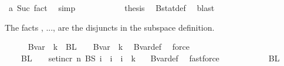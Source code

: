 \begin{isabellebody}
\ a\ Suc\ fact{}\ \isamarkupfalse%
\ simp\isanewline
\ \ \ \ \ \ \ \ \isamarkupfalse%
\ \isamarkupfalse%
\ {\isacharquery}{\kern0pt}thesis\ \isamarkupfalse%
\ Bstat{\isacharunderscore}{\kern0pt}def\ \isamarkupfalse%
\ blast\isanewline
\ \ \ \ \ \ \isamarkupfalse%
\isanewline
\ \ \ \ \isamarkupfalse%
%
\begin{isamarkuptext}%
The facts , ...,  are the disjuncts in the subspace definition.%
\end{isamarkuptext}\isamarkuptrue%
\ \ \ \ \isamarkupfalse%
\ {\isachardoublequoteopen}Bvar\ {\isacharbackquote}{\kern0pt}\ {\isacharbraceleft}{\kern0pt}{\isachardot}{\kern0pt}{\isachardot}{\kern0pt}{\isacharless}{\kern0pt}k{\isacharplus}{\kern0pt}{}{\isacharbraceright}{\kern0pt}\ {\isacharequal}{\kern0pt}\ BL\ {\isacharbackquote}{\kern0pt}\ {\isacharbraceleft}{\kern0pt}{\isachardot}{\kern0pt}{\isachardot}{\kern0pt}{\isacharless}{\kern0pt}{}{\isacharbraceright}{\kern0pt}\ {\isasymunion}\ Bvar\ {\isacharbackquote}{\kern0pt}\ {\isacharbraceleft}{\kern0pt}{}{\isachardot}{\kern0pt}{\isachardot}{\kern0pt}{\isacharless}{\kern0pt}k{\isacharplus}{\kern0pt}{}{\isacharbraceright}{\kern0pt}{\isachardoublequoteclose}\ \isamarkupfalse%
\ Bvar{\isacharunderscore}{\kern0pt}def\ \isamarkupfalse%
\ force\isanewline
\ \ \ \ \isamarkupfalse%
\ \isamarkupfalse%
\ {\isachardoublequoteopen}\ {\isachardot}{\kern0pt}{\isachardot}{\kern0pt}{\isachardot}{\kern0pt}\ {\isacharequal}{\kern0pt}\ BL\ {\isacharbackquote}{\kern0pt}\ {\isacharbraceleft}{\kern0pt}{\isachardot}{\kern0pt}{\isachardot}{\kern0pt}{\isacharless}{\kern0pt}{}{\isacharbraceright}{\kern0pt}\ {\isasymunion}\ {\isacharbraceleft}{\kern0pt}set{\isacharunderscore}{\kern0pt}incr\ n\ {\isacharparenleft}{\kern0pt}BS\ i{\isacharparenright}{\kern0pt}\ {\isacharbar}{\kern0pt}\ i\ {\isachardot}{\kern0pt}\ i\ {\isasymin}\ {\isacharbraceleft}{\kern0pt}{\isachardot}{\kern0pt}{\isachardot}{\kern0pt}{\isacharless}{\kern0pt}k{\isacharbraceright}{\kern0pt}{\isacharbraceright}{\kern0pt}\ {\isachardoublequoteclose}\ \isamarkupfalse%
\ Bvar{\isacharunderscore}{\kern0pt}def\ \isamarkupfalse%
\ fastforce\ \ \isanewline
\ \ \ \ \isamarkupfalse%
\ \isamarkupfalse%
\ {\isachardoublequoteopen}{\isacharbraceleft}{\kern0pt}{\isacharbraceright}{\kern0pt}\ {\isasymnotin}\ BL\ {\isacharbackquote}{\kern0pt}\ {\isacharbraceleft}{\kern0pt}{\isachardot}{\kern0pt}{\isachardot}{\kern0pt}{\isacharless}{\kern0pt}{}{\isacharbraceright}{\kern0pt}{\isachardoublequoteclose}\ \isamarkupfalse%

\end{isabellebody}
